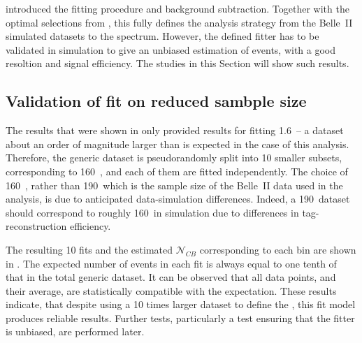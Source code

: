  introduced the fitting procedure and \BB background subtraction.
Together with the optimal selections from , this fully defines the analysis strategy from the Belle~II simulated datasets to the \BtoXsgamma spectrum.
However, the defined fitter has to be validated in simulation to give an unbiased estimation of \BtoXsgamma events, with a good resoltion and signal efficiency.
The studies in this Section will show such results.

\subsection{Validation of \texorpdfstring{\Mbc}{Mbc} fit on reduced sambple size}\label{sec:mbc_fit_validation_misreconstructed}

The results that were shown in  only provided results for fitting 1.6~\invab -- a dataset about an order of magnitude larger than is expected in the case of this analysis.
Therefore, the generic \MC dataset is pseudorandomly split into 10 smaller subsets, corresponding to 160~\invfb, and each of them are fitted independently.
The choice of 160~\invfb, rather than 190~\invfb which is the sample size of the Belle~II data used in the analysis, is due to anticipated data-simulation differences.
Indeed, a 190~\invfb dataset should correspond to roughly 160~\invfb in simulation due to differences in tag-\B reconstruction efficiency.

The resulting 10 fits and the estimated $\mathcal{N}_{CB}$ corresponding to each \EB bin are shown in .
The expected number of events in each fit is always equal to one tenth of that in the total generic \MC dataset.
It can be observed that all data points, and their average, are statistically compatible with the expectation.
These results indicate, that despite using a 10 times larger dataset to define the , this \Mbc fit model produces reliable results.
Further tests, particularly a test ensuring that the fitter is unbiased, are performed later.

